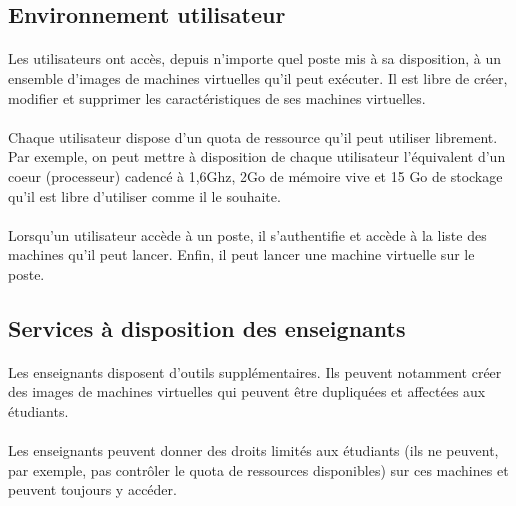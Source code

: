 \subsection{Environnement utilisateur}

\paragraph{} Les utilisateurs ont accès, depuis n'importe quel poste mis à sa
disposition, à un ensemble d'images de machines virtuelles qu'il peut exécuter.
Il est libre de créer, modifier et supprimer les caractéristiques de ses
machines virtuelles.

\paragraph{} Chaque utilisateur dispose d'un quota de ressource qu'il peut
utiliser librement. Par exemple, on peut mettre à disposition de chaque
utilisateur l'équivalent d'un coeur (processeur) cadencé à 1,6Ghz, 2Go de
mémoire vive et 15 Go de stockage qu'il est libre d'utiliser comme il le
souhaite.

\paragraph{} Lorsqu'un utilisateur accède à un poste, il s'authentifie et
accède à la liste des machines qu'il peut lancer. Enfin, il peut lancer une
machine virtuelle sur le poste.

\subsection{Services à disposition des enseignants}

\paragraph{} Les enseignants disposent d'outils supplémentaires. Ils peuvent
notamment créer des images de machines virtuelles qui peuvent être dupliquées
et affectées aux étudiants.

\paragraph{} Les enseignants peuvent donner des droits limités aux étudiants
(ils ne peuvent, par exemple, pas contrôler le quota de ressources disponibles)
sur ces machines et peuvent toujours y accéder.

